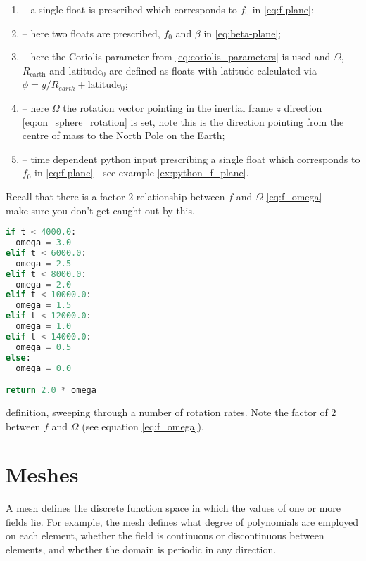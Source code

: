 \begin{enumerate}
  \item {} -- a single float is prescribed which corresponds to
        $f_0$ in \eqref{eq:f-plane};
  \item {} -- here two floats are prescribed, $f_0$ and
        $\beta$ in \eqref{eq:beta-plane};
  \item {} -- here the Coriolis parameter from
        \eqref{eq:coriolis_parameters} is used and $\Omega$, 
        $R_{\textrm{earth}}$ and $\textrm{latitude}_0$ are defined as floats with
        latitude calculated via 
        $\phi = y/R_{earth} + \textrm{latitude}_0$;
  \item {} -- here $\Omega$ the rotation vector pointing in the
        inertial frame $z$ direction  \eqref{eq:on_sphere_rotation} is set,
        note this is the direction pointing from the centre of mass to the North
        Pole on the Earth;
 \item {} -- time dependent python input
       prescribing a single float which corresponds to
       $f_0$ in \eqref{eq:f-plane} - see example \ref{ex:python_f_plane}.
\end{enumerate}

Recall that there is a factor $2$ relationship between $f$ and $\Omega$
\eqref{eq:f_omega} --- make sure you don't get caught out by this.

\begin{example}
\begin{lstlisting}[language = Python]
if t < 4000.0:
  omega = 3.0
elif t < 6000.0:
  omega = 2.5
elif t < 8000.0:
  omega = 2.0
elif t < 10000.0:
  omega = 1.5
elif t < 12000.0:
  omega = 1.0
elif t < 14000.0:
  omega = 0.5
else:
  omega = 0.0

return 2.0 * omega
\end{lstlisting}
\caption{ definition, sweeping through a number of
         rotation rates. Note the factor of $2$ between $f$ and $\Omega$ (see
         equation \eqref{eq:f_omega}).}
\label{ex:python_f_plane}
\end{example}


\section{Meshes}\label{sec:Mesh}

A mesh defines the discrete
function space in which the values of one or more fields lie. For example, the mesh
defines what degree of polynomials are employed on each element, whether the
field is continuous or discontinuous between elements, and whether the
domain is periodic in any direction. 

